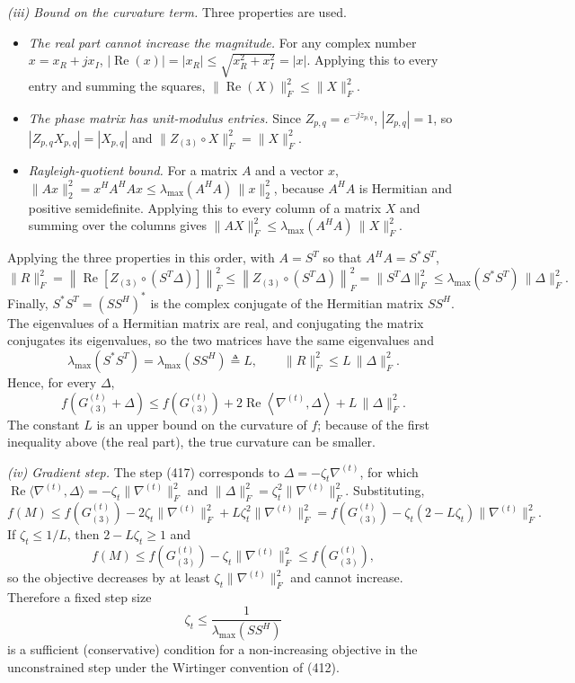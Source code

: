 \documentclass[12pt,a4paper]{article}
\begin{document}
\emph{(iii) Bound on the curvature term.} Three properties are used.
\begin{itemize}
\item \emph{The real part cannot increase the magnitude.} For any complex
number $x=x_R+jx_I$, $|\operatorname{Re}(x)|=|x_R|\leq\sqrt{x_R^2+x_I^2}=|x|$.
Applying this to every entry and summing the squares,
$\|\operatorname{Re}(X)\|_F^2\leq\|X\|_F^2$.
\item \emph{The phase matrix has unit-modulus entries.} Since
$Z_{p,q}=e^{-jz_{p,q}}$, $|Z_{p,q}|=1$, so
$|Z_{p,q}X_{p,q}|=|X_{p,q}|$ and
$\|Z_{(3)}\circ X\|_F^2=\|X\|_F^2$.
\item \emph{Rayleigh-quotient bound.} For a matrix $A$ and a vector $x$,
$\|Ax\|_2^2=x^HA^HAx\leq\lambda_{\max}(A^HA)\,\|x\|_2^2$, because $A^HA$ is
Hermitian and positive semidefinite. Applying this to every column of a
matrix $X$ and summing over the columns gives
$\|AX\|_F^2\leq\lambda_{\max}(A^HA)\,\|X\|_F^2$.
\end{itemize}
Applying the three properties in this order, with $A=S^T$ so that
$A^HA=S^{*}S^T$,
\[
\|R\|_F^2
=\left\|\operatorname{Re}\!\left[Z_{(3)}\circ(S^T\Delta)\right]\right\|_F^2
\leq
\left\|Z_{(3)}\circ(S^T\Delta)\right\|_F^2
=
\|S^T\Delta\|_F^2
\leq
\lambda_{\max}(S^*S^T)\,\|\Delta\|_F^2 .
\]
Finally, $S^{*}S^T=(SS^H)^{*}$ is the complex conjugate of the Hermitian
matrix $SS^H$. The eigenvalues of a Hermitian matrix are real, and conjugating
the matrix conjugates its eigenvalues, so the two matrices have the same
eigenvalues and
\[
\lambda_{\max}(S^*S^T)=\lambda_{\max}(SS^H)\triangleq L,
\qquad
\|R\|_F^2\leq L\,\|\Delta\|_F^2 .
\]
Hence, for every $\Delta$,
\[
f\!\left(G_{(3)}^{(t)}+\Delta\right)
\leq
f\!\left(G_{(3)}^{(t)}\right)
+2\operatorname{Re}\left\langle\nabla^{(t)},\Delta\right\rangle
+L\,\|\Delta\|_F^2 .
\]
The constant $L$ is an upper bound on the curvature of $f$; because of the
first inequality above (the real part), the true curvature can be smaller.

\emph{(iv) Gradient step.} The step (417) corresponds to
$\Delta=-\zeta_t\nabla^{(t)}$, for which
$\operatorname{Re}\langle\nabla^{(t)},\Delta\rangle
=-\zeta_t\|\nabla^{(t)}\|_F^2$ and
$\|\Delta\|_F^2=\zeta_t^2\|\nabla^{(t)}\|_F^2$. Substituting,
\[
f(M)
\leq
f\!\left(G_{(3)}^{(t)}\right)
-2\zeta_t\|\nabla^{(t)}\|_F^2
+L\zeta_t^2\|\nabla^{(t)}\|_F^2
=
f\!\left(G_{(3)}^{(t)}\right)
-\zeta_t\left(2-L\zeta_t\right)\|\nabla^{(t)}\|_F^2 .
\]
If $\zeta_t\leq1/L$, then $2-L\zeta_t\geq1$ and
\[
f(M)\leq f\!\left(G_{(3)}^{(t)}\right)-\zeta_t\|\nabla^{(t)}\|_F^2
\leq f\!\left(G_{(3)}^{(t)}\right),
\]
so the objective decreases by at least $\zeta_t\|\nabla^{(t)}\|_F^2$ and cannot
increase. Therefore a fixed step size
\begin{equation}
\boxed{
\zeta_t\leq\frac{1}{\lambda_{\max}(SS^H)}
}
\tag{418a}
\end{equation}
is a sufficient (conservative) condition for a non-increasing objective in the
unconstrained step under the Wirtinger convention of (412).
\end{document}
